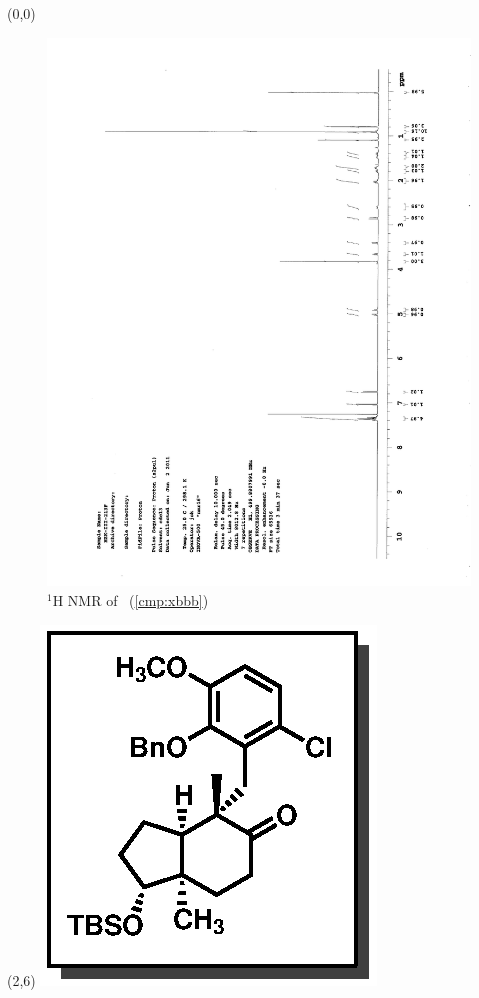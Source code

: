 \begin{textblock}{20}(0,0)
\begin{figure}[htb]
\caption{$^1$H NMR of \CMPxbbb\ (\ref{cmp:xbbb})}
\includegraphics[scale=0.75, trim = 0mm 0mm 0mm 5mm,
clip]{chp_singlecarbon/images/nmr/xbbbH}
\vspace{-100pt}
\end{figure}
\end{textblock}
\begin{textblock}{1}(2,6)
\includegraphics[scale=0.8, angle=90]{chp_singlecarbon/images/xbbb}
\end{textblock}
